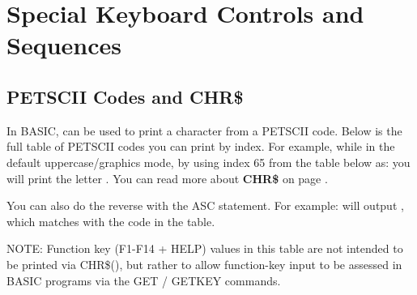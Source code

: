 \chapter{Special Keyboard Controls and Sequences}


\section{PETSCII Codes and CHR\$}

\label{appendix:asciicodes}

In BASIC,   can be used to print a character from a PETSCII code.
Below is the full table of PETSCII codes you can print by index.  For example, while in the default uppercase/graphics mode, by
using index 65 from the table below as:  you will
print the letter . You can read more about {\bf CHR\$} on page \pageref{chrcommand}.

You can also do the reverse with the ASC statement.  For example:
 will output , which matches with the
code in the table.

NOTE: Function key (F1-F14 + HELP) values in this table are not intended to be printed via CHR\$(),
but rather to allow function-key input to be assessed in BASIC programs via the GET / GETKEY commands.

